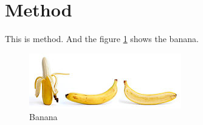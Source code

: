 \section{Method}
\label{sec:method}

This is method. And the figure \ref{fig:banana} shows the banana.

\begin{figure}
    \includegraphics[width=\textwidth]{figures/banana.jpg}
    \caption{Banana}
    \label{fig:banana}
\end{figure}


